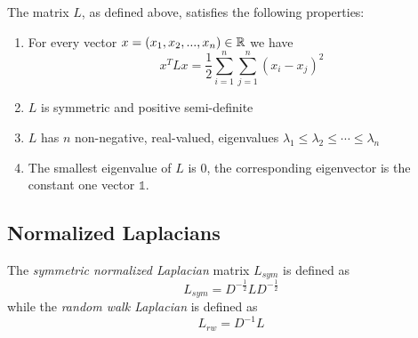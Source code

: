 	\begin{proposition}
	    The matrix $L$, as defined above, satisfies the following properties:
	    \begin{enumerate}
	    	\item For every vector $x=(x_1,x_2, ..., x_n)\in \mathbb{R}$ we have 
	    	\begin{displaymath}
	    		x^TLx = \frac{1}{2}\sum_{i=1}^n\sum_{j=1}^n \left(x_i-x_j\right)^2
	    	\end{displaymath}
	    	\item $L$ is symmetric and positive semi-definite
	    	\item $L$ has $n$ non-negative, real-valued, eigenvalues $\lambda_1 \leq \lambda_2 \leq \cdots \leq \lambda_n$
		    \item The smallest eigenvalue of $L$ is $0$, the corresponding eigenvector is the constant one vector $\mathbb 1$.
	    \end{enumerate}
    \end{proposition}
 
\subsection{Normalized Laplacians}
	The \textit{symmetric normalized Laplacian} matrix $L_{sym}$ is defined as
	\begin{displaymath}
		L_{sym} = D^{-\frac{1}{2}}LD^{-\frac{1}{2}}
	\end{displaymath}
	while the \textit{random walk Laplacian} is defined as 
	\begin{displaymath}
		L_{rw} = D^{-1}L
	\end{displaymath}


